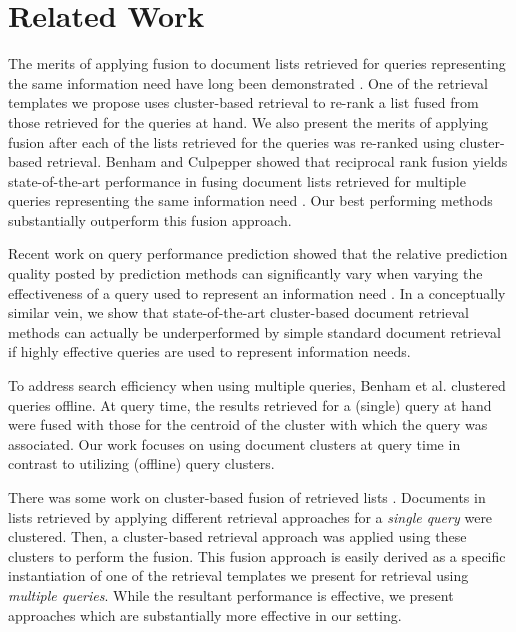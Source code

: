 \section{Related Work}
\label{sec:rel}
The merits of applying fusion to document lists retrieved for queries
representing the same information need have long been demonstrated
\cite{Belkin+al:93a,Belkin+al:95a,Pickens+al:08a,bailey2017retrieval,bc17-adcs,Benham+al:19a}. One
of the retrieval templates we propose uses cluster-based retrieval to
re-rank a list fused from those retrieved for the queries at hand. We
also present the merits of applying fusion after each of the lists
retrieved for the queries was re-ranked using cluster-based
retrieval. Benham and Culpepper \cite{bc17-adcs} showed that
reciprocal rank fusion \cite{Cormack+al:09a} yields state-of-the-art
performance in fusing document lists retrieved for multiple queries representing the same information need . Our best
performing methods substantially outperform this fusion approach.

Recent work on query performance prediction showed that the relative
prediction quality posted by prediction methods can significantly vary
when varying the effectiveness of a query used to represent an
information need \cite{Zendel+al:19a}. In a conceptually similar vein, we show that state-of-the-art
cluster-based document retrieval methods can actually be underperformed by
simple standard document retrieval if highly effective queries are used to
represent information needs.

To address search efficiency when using multiple queries, Benham et
al. \cite{Benham+al:19a} clustered queries offline. At query time, the
results retrieved for a (single) query at hand were fused with those
for the centroid of the cluster with which the query was
associated. Our work focuses on using document clusters
at query time in contrast to utilizing (offline) query clusters.

There was some work on cluster-based fusion of retrieved lists
\cite{Kozorovitzky+Kurland:11b}. Documents in lists retrieved by applying different
retrieval approaches for a {\em single query} were
clustered. Then, a cluster-based retrieval approach was applied using
these clusters to perform the fusion. This fusion approach is easily derived as a specific instantiation of one of the retrieval templates we present for retrieval using {\em multiple queries}. While the resultant performance is effective, we present approaches which are substantially more effective in our setting.







